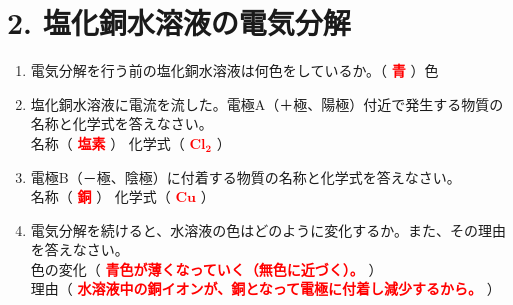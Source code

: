 \section*{2. 塩化銅水溶液の電気分解}
\begin{enumerate}
    \item 電気分解を行う前の塩化銅水溶液は何色をしているか。（ \textcolor{red}{\textbf{青}} ）色
    \item 塩化銅水溶液に電流を流した。電極A（＋極、陽極）付近で発生する物質の名称と化学式を答えなさい。\\[0.2cm]
    名称（ \textcolor{red}{\textbf{塩素}} ） \hspace{1cm} 化学式（ \textcolor{red}{$\mathbf{Cl_2}$} ）
    \item 電極B（－極、陰極）に付着する物質の名称と化学式を答えなさい。\\[0.2cm]
    名称（ \textcolor{red}{\textbf{銅}} ） \hspace{1cm} 化学式（ \textcolor{red}{$\mathbf{Cu}$} ）
    \item 電気分解を続けると、水溶液の色はどのように変化するか。また、その理由を答えなさい。\\[0.2cm]
    色の変化（ \textcolor{red}{\textbf{青色が薄くなっていく（無色に近づく）。}} ）\\[0.2cm]
    理由（ \textcolor{red}{\textbf{水溶液中の銅イオンが、銅となって電極に付着し減少するから。}} ）
\end{enumerate}
